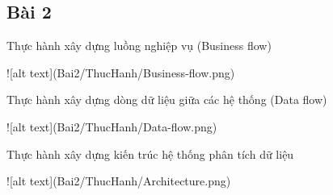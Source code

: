 \documentclass{article}
\begin{document}
\subsection{Bài 2}

\caption{Thực hành xây dựng luồng nghiệp vụ (Business flow)}
![alt text](Bai2/ThucHanh/Business-flow.png)
\caption{Thực hành xây dựng dòng dữ liệu giữa các hệ thống (Data flow)}
![alt text](Bai2/ThucHanh/Data-flow.png)
\caption{Thực hành xây dựng kiến trúc hệ thống phân tích dữ liệu}
![alt text](Bai2/ThucHanh/Architecture.png)

\end{document}
